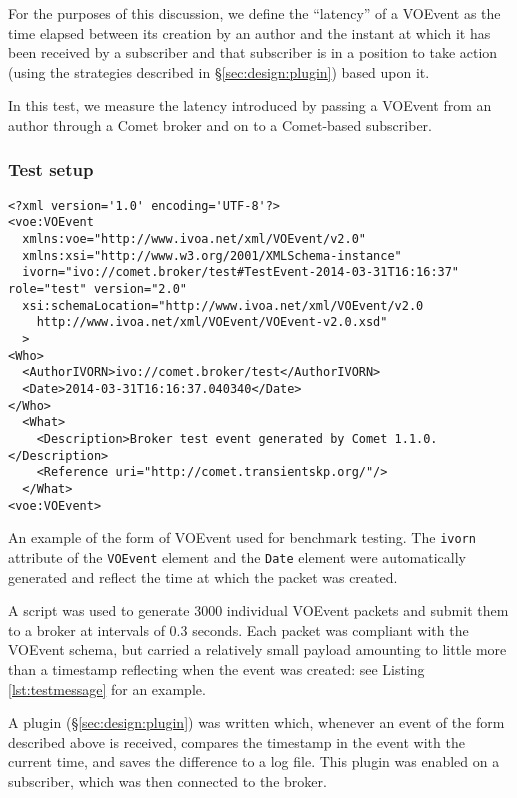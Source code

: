 \documentclass[5p,authoryear]{elsarticle}
\begin{document}
For the purposes of this discussion, we define the ``latency'' of a VOEvent as
the time elapsed between its creation by an author and the instant at which it
has been received by a subscriber and that subscriber is in a position to take
action (using the strategies described in \S\ref{sec:design:plugin}) based
upon it.

In this test, we measure the latency introduced by passing a VOEvent from an
author through a Comet broker and on to a Comet-based subscriber.

\subsubsection{Test setup}
\label{sec:perf:latency:setup}

\begin{listing*}
\begin{verbatim}
<?xml version='1.0' encoding='UTF-8'?>
<voe:VOEvent
  xmlns:voe="http://www.ivoa.net/xml/VOEvent/v2.0"
  xmlns:xsi="http://www.w3.org/2001/XMLSchema-instance"
  ivorn="ivo://comet.broker/test#TestEvent-2014-03-31T16:16:37" role="test" version="2.0"
  xsi:schemaLocation="http://www.ivoa.net/xml/VOEvent/v2.0
    http://www.ivoa.net/xml/VOEvent/VOEvent-v2.0.xsd"
  >
<Who>
  <AuthorIVORN>ivo://comet.broker/test</AuthorIVORN>
  <Date>2014-03-31T16:16:37.040340</Date>
</Who>
  <What>
    <Description>Broker test event generated by Comet 1.1.0.</Description>
    <Reference uri="http://comet.transientskp.org/"/>
  </What>
<voe:VOEvent>
\end{verbatim}
\caption{An example of the form of VOEvent used for benchmark testing. The
\texttt{ivorn} attribute of the \texttt{VOEvent} element and the \texttt{Date}
element were automatically generated and reflect the time at which the packet
was created.}
\label{lst:testmessage}
\end{listing*}

A script was used to generate 3000 individual VOEvent packets and submit them
to a broker at intervals of 0.3 seconds.  Each packet was compliant with the
VOEvent schema, but carried a relatively small payload amounting to little
more than a timestamp reflecting when the event was created: see Listing
\ref{lst:testmessage} for an example.

A plugin (\S\ref{sec:design:plugin}) was written which, whenever an event of
the form described above is received, compares the timestamp in the event with
the current time, and saves the difference to a log file. This plugin was
enabled on a subscriber, which was then connected to the broker.
\end{document}

